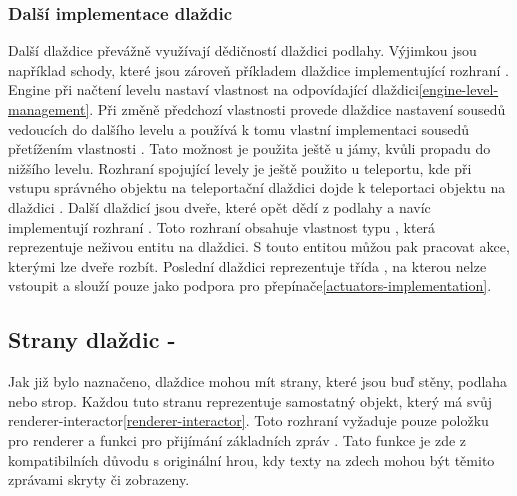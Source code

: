\subsubsection{Další implementace dlaždic}
Další dlaždice převážně využívají dědičností dlaždici podlahy. Výjimkou jsou například schody,
které jsou zároveň příkladem dlaždice implementující rozhraní . Engine při načtení 
levelu nastaví vlastnost  na odpovídající dlaždici\vref{engine-level-management}.
Při změně předchozí vlastnosti provede dlaždice nastavení sousedů vedoucích do dalšího levelu a používá k tomu vlastní 
implementaci sousedů přetížením vlastnosti . Tato možnost je použita ještě u jámy, kvůli propadu do nižšího levelu. 
Rozhraní spojující levely je ještě použito u teleportu, kde při vstupu správného objektu na teleportační dlaždici 
dojde k teleportaci objektu na dlaždici . Další dlaždicí jsou dveře, které opět 
dědí z podlahy a navíc implementují rozhraní . Toto rozhraní obsahuje vlastnost typu ,
která reprezentuje neživou entitu na dlaždici. S touto entitou můžou pak pracovat akce, kterými lze dveře rozbít.
Poslední dlaždici reprezentuje třída , na kterou nelze vstoupit a slouží pouze jako podpora
pro přepínače\vref{actuators-implementation}.

\subsection{Strany dlaždic - }\label{tile-sides-section}
Jak již bylo naznačeno, dlaždice mohou mít strany, které jsou buď stěny, podlaha nebo strop.
Každou tuto stranu reprezentuje samostatný objekt, který má svůj renderer-interactor\vref{renderer-interactor}. 
Toto rozhraní vyžaduje pouze položku pro renderer a funkci pro přijímání základních zpráv . 
Tato funkce je zde z kompatibilních důvodu s originální hrou, kdy texty na zdech mohou být těmito 
zprávami skryty či zobrazeny.

